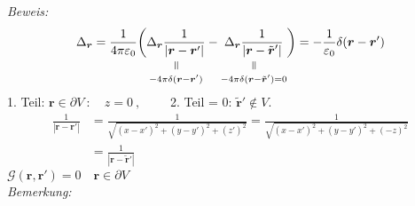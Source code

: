 \documentclass[titlepage,11pt,a4paper,ngerman]{report}
\newcommand{\verteq}{\rotatebox{90}{$\,=$}}
\newcommand{\equalto}[2]{\underset{\scriptstyle\overset{\mkern4mu\verteq}{#2}}{#1}}
\newcommand{\gre}{\mathcal{G}}
\newcommand{\kq}{\frac{1}{4\pi\epsilon_0}}
\renewcommand{\vec}[1]{\boldsymbol{#1}}
\renewcommand{\epsilon}{\varepsilon}
\begin{document}
\emph{Beweis:}
\begin{equation*}
\Delta_{\vec{r}} = \kq \bigg(\equalto{\Delta_{\vec{r}} \frac{1}{|\vec{r} - \vec{r}'|}}{- 4 \pi \delta(\vec{r} - \vec{r}')} - \equalto{\Delta_{\vec{r}} \frac{1}{|\vec{r} - \tilde{\vec{r}}'|}}{- 4 \pi \delta(\vec{r} - \tilde{\vec{r}}') = 0 }\bigg) = - \frac{1}{\epsilon_0} \delta(\vec{r} - \vec{r}')
\end{equation*}
1. Teil: $ \vec{r} \in \partial V \ : \quad z = 0 \ ,\qquad$ 2. Teil = 0: $ \tilde{\vec{r}}' \notin V $.
\begin{align*}
\frac{1}{|\vec{r} - \vec{r}'|} &= \frac{1}{\sqrt{(x-x')^2 + (y - y')^2 + (z')^2}} = \frac{1}{\sqrt{(x-x')^2 + (y-y')^2 + (-z)^2}}\\
&= \frac{1}{|\vec{r} - \tilde{\vec{r}}'|}
\end{align*}
$ \gre(\vec{r},\vec{r}') = 0 \quad \vec{r} \in \partial V $\\[5pt]
\emph{Bemerkung:}
\end{document}
